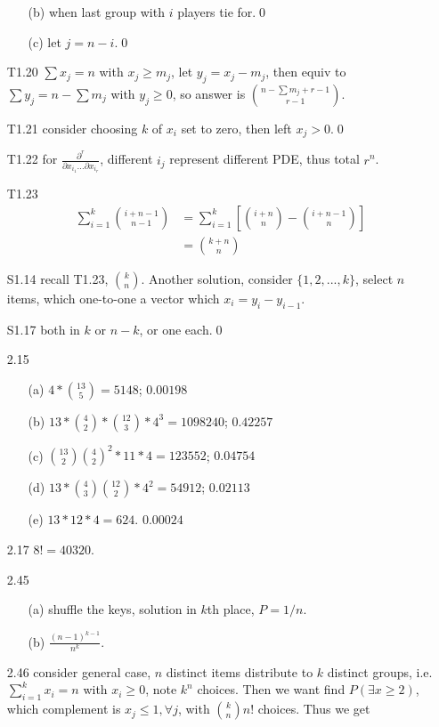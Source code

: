 \documentclass[paper=a4, fontsize=11pt]{scrartcl} %
\numberwithin{equation}{section} %
\numberwithin{figure}{section} %
\numberwithin{table}{section} %
\begin{document}
\begin{itemize}
	\begin{itemize}
		\item[(b)] when last group with $i$ players tie for.\qed
		\item[(c)] let $j=n-i$.\qed
	\end{itemize}
	\item[T1.20] $\sum x_j=n$ with $x_j\geq m_j$, let $y_j = x_j-m_j$, then equiv to $\sum y_j = n-\sum m_j$ with $y_j\geq 0$, so answer is ${n-\sum m_j + r -1 \choose r-1}$.
	\item[T1.21] consider choosing $k$ of $x_i$ set to zero, then left $x_j>0$.\qed 
	\item[T1.22] for $\frac{\partial^r}{\partial x_{i_1}\dots \partial x_{i_r}}$, different $i_j$ represent different PDE, thus total $r^n$.
	\item[T1.23]
	\begin{align}
		\sum_{i=1}^k {i+n-1 \choose n-1} &= \sum_{i=1}^k \left[{i+n \choose n} - {i+n-1 \choose n}\right]\\
		&= {k+n \choose n}
	\end{align}
	\item[S1.14] recall T1.23, ${k\choose n}$. Another solution, consider $\{1,2,...,k\}$, select $n$ items, which one-to-one a vector which $x_i = y_i-y_{i-1}$.
	\item[S1.17] both in $k$ or $n-k$, or one each.\qed
	\item[2.15]
	\begin{itemize}
		\item[(a)] $4*{13 \choose 5} =  5148$; $0.00198$
		\item[(b)] $13*{4\choose 2}*{12\choose 3}*4^3 = 1098240$; $0.42257$
		\item[(c)] ${13\choose 2}{4\choose 2}^2*11*4 = 123552$; $0.04754$
		\item[(d)] $13*{4\choose 3}{12\choose 2}*4^2 = 54912$; $0.02113$
		\item[(e)] $13*12*4=624$. $0.00024$
	\end{itemize}
	\item[2.17] $8!=40320$.
	\item[2.45] 
	\begin{itemize}
		\item[(a)] shuffle the keys, solution in $k$th place, $P=1/n$.
		\item[(b)] $\frac{(n-1)^{k-1}}{n^k}$.
	\end{itemize}
	\item[2.46] consider general case, $n$ distinct items distribute to $k$ distinct groups, i.e. $\sum_{i=1}^k x_i= n$ with $x_i\geq 0$, note $k^n$ choices. Then we want find $P(\exists x\geq 2)$, which complement is $x_j\leq 1,\forall j$, with ${k \choose n} n!$ choices. Thus we get

\end{itemize}
\end{document}

